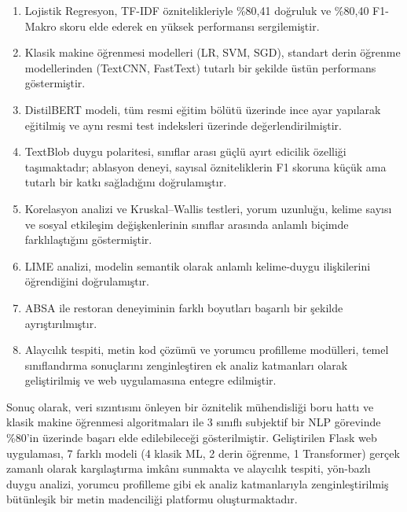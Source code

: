 \documentclass[conference]{IEEEtran}
\begin{document}
\begin{enumerate}
    \item Lojistik Regresyon, TF-IDF öznitelikleriyle \%80,41 doğruluk ve \%80,40 F1-Makro skoru elde ederek en yüksek performansı sergilemiştir.
    \item Klasik makine öğrenmesi modelleri (LR, SVM, SGD), standart derin öğrenme modellerinden (TextCNN, FastText) tutarlı bir şekilde üstün performans göstermiştir.

    \item DistilBERT modeli, tüm resmi eğitim bölütü üzerinde ince ayar yapılarak eğitilmiş ve aynı resmi test indeksleri üzerinde değerlendirilmiştir.
    \item TextBlob duygu polaritesi, sınıflar arası güçlü ayırt edicilik özelliği taşımaktadır; ablasyon deneyi, sayısal özniteliklerin F1 skoruna küçük ama tutarlı bir katkı sağladığını doğrulamıştır.
    \item Korelasyon analizi ve Kruskal--Wallis testleri, yorum uzunluğu, kelime sayısı ve sosyal etkileşim değişkenlerinin sınıflar arasında anlamlı biçimde farklılaştığını göstermiştir.
    \item LIME analizi, modelin semantik olarak anlamlı kelime-duygu ilişkilerini öğrendiğini doğrulamıştır.
    \item ABSA ile restoran deneyiminin farklı boyutları başarılı bir şekilde ayrıştırılmıştır.
    \item Alaycılık tespiti, metin kod çözümü ve yorumcu profilleme modülleri, temel sınıflandırma sonuçlarını zenginleştiren ek analiz katmanları olarak geliştirilmiş ve web uygulamasına entegre edilmiştir.
\end{enumerate}

Sonuç olarak, veri sızıntısını önleyen bir öznitelik mühendisliği boru hattı ve klasik makine öğrenmesi algoritmaları ile 3 sınıflı subjektif bir NLP görevinde \%80'in üzerinde başarı elde edilebileceği gösterilmiştir. Geliştirilen Flask web uygulaması, 7 farklı modeli (4 klasik ML, 2 derin öğrenme, 1 Transformer) gerçek zamanlı olarak karşılaştırma imkânı sunmakta ve alaycılık tespiti, yön-bazlı duygu analizi, yorumcu profilleme gibi ek analiz katmanlarıyla zenginleştirilmiş bütünleşik bir metin madenciliği platformu oluşturmaktadır.
\end{document}

